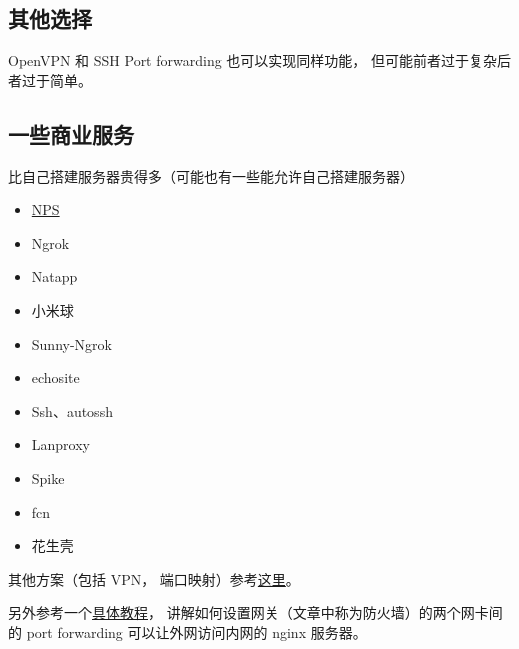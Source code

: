 \subsection{其他选择}
OpenVPN 和 SSH Port forwarding 也可以实现同样功能， 但可能前者过于复杂后者过于简单。

\subsection{一些商业服务}
比自己搭建服务器贵得多（可能也有一些能允许自己搭建服务器）
\begin{itemize}
\item \href{http://www.example.com}{NPS}
\item Ngrok
\item Natapp
\item 小米球
\item Sunny-Ngrok
\item echosite
\item Ssh、autossh
\item Lanproxy
\item Spike
\item fcn
\item 花生壳
\end{itemize}

其他方案（包括 VPN， 端口映射）参考\href{https://johackim.com/how-to-expose-local-server-behind-firewall}{这里}。

另外参考一个\href{https://www.digitalocean.com/community/tutorials/how-to-forward-ports-through-a-linux-gateway-with-iptables}{具体教程}， 讲解如何设置网关（文章中称为防火墙）的两个网卡间的 port forwarding 可以让外网访问内网的 nginx 服务器。 

